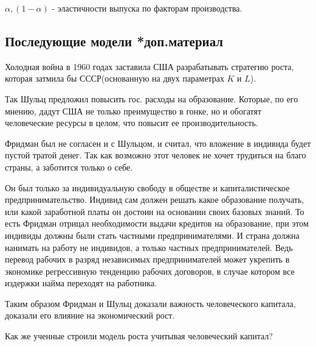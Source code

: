 \documentclass[reqno]{article}
\theoremstyle{definition}
\theoremstyle{definition}
\theoremstyle{definition}
\theoremstyle{definition}
\theoremstyle{definition}
\theoremstyle{definition}
\theoremstyle{definition}
\theoremstyle{definition}
\theoremstyle{definition}
\begin{document}
		$\alpha, (1 - \alpha)$ - эластичности выпуска по факторам производства.
		
		\subsection{Последующие модели *доп.материал}
			Холодная война в 1960 годах заставила США разрабатывать стратегию роста, которая затмила бы СССР(основанную на двух параметрах $K$ и $L$).
			
			Так Шульц предложил повысить гос. расходы на образование. Которые, по его мнению, дадут США не только преимущество в гонке, но и обогатят человеческие ресурсы в целом, что повысит ее производительность.
			
			Фридман был не согласен и с Шульцом, и считал, что вложение в индивида будет пустой тратой денег. Так как возможно этот человек не хочет трудиться на благо страны, а  заботится только о себе.
			
			Он был только за индивидуальную свободу в обществе и капиталистическое предпринимательство. Индивид сам должен решать какое образование получать, или какой заработной платы он достоин на основании своих базовых знаний. То есть Фридман отрицал необходимости выдачи кредитов на образование, при этом индивиды должны были стать частными предпринимателями. И страна должна нанимать на работу не индивидов, а только частных предпринимателей. Ведь перевод рабочих в разряд независимых предпринимателей может укрепить в экономике регрессивную тенденцию рабочих договоров, в случае котором все издержки найма переходят на работника.  
			
			Таким образом Фридман и Шульц доказали важность человеческого капитала, доказали его влияние на экономический рост.
			
			Как же ученные строили модель роста учитывая человеческий капитал?
			
\end{document}
